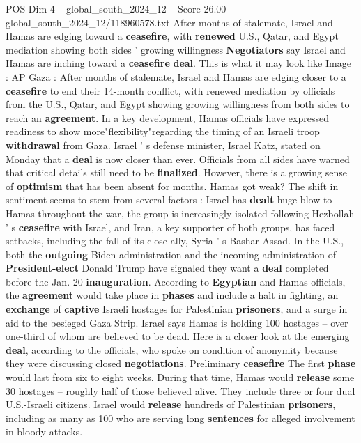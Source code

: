\begin{textsample}{POS Dim 4 – global\_south\_2024\_12 – Score 26.00 – global\_south\_2024\_12/118960578.txt}  \label{ex:f4_pos_232}
After months of stalemate, Israel and Hamas are edging toward a \textbf{ceasefire}, with \textbf{renewed} U.S., Qatar, and Egypt mediation showing both sides ' growing willingness \textbf{Negotiators} say Israel and Hamas are inching toward a \textbf{ceasefire} \textbf{deal}.
This is what it may look like Image : AP Gaza : After months of stalemate, Israel and Hamas are edging closer to a \textbf{ceasefire} to end their 14-month conflict, with renewed mediation by officials from the U.S., Qatar, and Egypt showing growing willingness from both sides to reach an \textbf{agreement}.
In a key development, Hamas officials have expressed readiness to show more"flexibility"regarding the timing of an Israeli troop \textbf{withdrawal} from Gaza.
Israel ' s defense minister, Israel Katz, stated on Monday that a \textbf{deal} is now closer than ever.
Officials from all sides have warned that critical details still need to be \textbf{finalized}.
However, there is a growing sense of \textbf{optimism} that has been absent for months.
Hamas got weak?
The shift in sentiment seems to stem from several factors : Israel has \textbf{dealt} huge blow to Hamas throughout the war, the group is increasingly isolated following Hezbollah ' s \textbf{ceasefire} with Israel, and Iran, a key supporter of both groups, has faced setbacks, including the fall of its close ally, Syria ' s Bashar Assad.
In the U.S., both the \textbf{outgoing} Biden administration and the incoming administration of \textbf{President-elect} Donald Trump have signaled they want a \textbf{deal} completed before the Jan. 20 \textbf{inauguration}.
According to \textbf{Egyptian} and Hamas officials, the \textbf{agreement} would take place in \textbf{phases} and include a halt in fighting, an \textbf{exchange} of \textbf{captive} Israeli hostages for Palestinian \textbf{prisoners}, and a surge in aid to the besieged Gaza Strip.
Israel says Hamas is holding 100 hostages -- over one-third of whom are believed to be dead.
Here is a closer look at the emerging \textbf{deal}, according to the officials, who spoke on condition of anonymity because they were discussing closed \textbf{negotiations}.
Preliminary \textbf{ceasefire} The first \textbf{phase} would last from six to eight weeks.
During that time, Hamas would \textbf{release} some 30 hostages -- roughly half of those believed alive.
They include three or four dual U.S.-Israeli citizens.
Israel would \textbf{release} hundreds of Palestinian \textbf{prisoners}, including as many as 100 who are serving long \textbf{sentences} for alleged involvement in bloody attacks.

\end{textsample}
